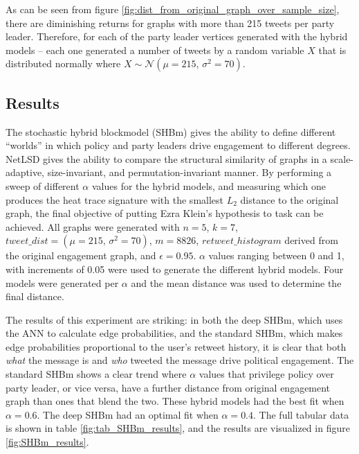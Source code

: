 As can be seen from figure \ref{fig:dist_from_original_graph_over_sample_size},
there are diminishing returns for graphs with more than 215 tweets per party
leader. Therefore, for each of the party leader vertices generated with the
hybrid models -- each one generated a number of tweets by a random variable $X$
that is distributed normally where $X \sim
\mathcal{N}(\mu=215,\,\sigma^{2}=70)$.

\subsection{Results}\label{sec:SBMsResults}

The stochastic hybrid blockmodel (SHBm) gives the ability to define different
``worlds'' in which policy and party leaders drive engagement to different
degrees. NetLSD gives the ability to compare the structural similarity of graphs
in a scale-adaptive, size-invariant, and permutation-invariant manner. By
performing a sweep of different $\alpha$ values for the hybrid models, and
measuring which one produces the heat trace signature with the smallest $L_2$
distance to the original graph, the final objective of putting Ezra Klein's
hypothesis to task can be achieved. All graphs were generated with $n=5$, $k=7$,
$tweet\_dist=(\mu=215,\,\sigma^{2}=70)$, $m=8826$, $retweet\_histogram$ derived
from the original engagement graph, and $\epsilon=0.95$. $\alpha$ values ranging
between 0 and 1, with increments of 0.05 were used to generate the different
hybrid models. Four models were generated per $\alpha$ and the mean distance was
used to determine the final distance.

The results of this experiment are striking: in both the deep SHBm, which uses
the ANN to calculate edge probabilities, and the standard SHBm, which makes edge
probabilities proportional to the user's retweet history, it is clear that both
\emph{what} the message is and \emph{who} tweeted the message drive political
engagement. The standard SHBm shows a clear trend where $\alpha$ values that
privilege policy over party leader, or vice versa, have a further distance from
original engagement graph than ones that blend the two. These hybrid models had
the best fit when $\alpha=0.6$. The deep SHBm had an optimal fit when
$\alpha=0.4$. The full tabular data is shown in table
\ref{fig:tab_SHBm_results}, and the results are visualized in figure
\ref{fig:SHBm_results}.

